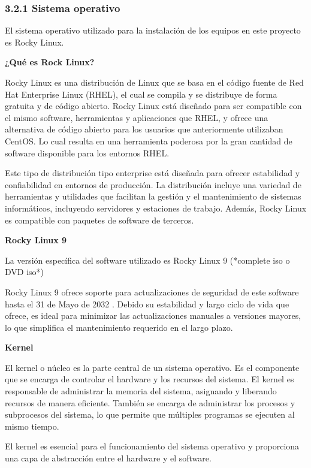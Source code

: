 \begin{spacing}{1.5}
  \subsubsection{3.2.1 Sistema operativo}
  El sistema operativo utilizado para la instalación de los equipos en este
  proyecto es Rocky Linux.

  \textbf{¿Qué es Rock Linux?}

  Rocky Linux es una distribución de Linux que se basa en el código fuente de
  Red Hat Enterprise Linux (RHEL), el cual se compila y se distribuye de forma
  gratuita y de código abierto. Rocky Linux está diseñado para ser compatible con
  el mismo software, herramientas y aplicaciones que RHEL, y ofrece una
  alternativa de código abierto para los usuarios que anteriormente utilizaban
  CentOS. Lo cual resulta en una herramienta poderosa por la gran cantidad de
  software disponible para los entornos RHEL.

  Este tipo de distribución tipo enterprise está diseñada para ofrecer
  estabilidad y confiabilidad en entornos de producción. La distribución incluye
  una variedad de herramientas y utilidades que facilitan la gestión y el
  mantenimiento de sistemas informáticos, incluyendo servidores y estaciones de
  trabajo. Además, Rocky Linux es compatible con paquetes de software de
  terceros. \cite{RL-1}

  \textbf{Rocky Linux 9}

  La versión específica del software utilizado es Rocky Linux 9 (*complete
  iso o DVD iso*) \cite{RL9-download-1} \cite{RL9-release-1}
  \cite{RHEL-release-1}

  Rocky Linux 9 ofrece soporte para actualizaciones de seguridad de este
  software hasta el 31 de Mayo de 2032 \cite{RL9-EOL-1}. Debido su estabilidad y
  largo ciclo de vida que ofrece, es ideal para minimizar las actualizaciones
  manuales a versiones mayores, lo que simplifica el mantenimiento requerido en
  el largo plazo.

  \textbf{Kernel}

  El kernel o núcleo es la parte central de un sistema operativo. Es el
  componente que se encarga de controlar el hardware y los recursos del sistema.
  El kernel es responsable de administrar la memoria del sistema, asignando y
  liberando recursos de manera eficiente. También se encarga de administrar los
  procesos y subprocesos del sistema, lo que permite que múltiples programas se
  ejecuten al mismo tiempo.

  El kernel es esencial para el funcionamiento del sistema operativo y
  proporciona una capa de abstracción entre el hardware y el software.
  \cite{RHEL-kernel-1}


\end{spacing}
